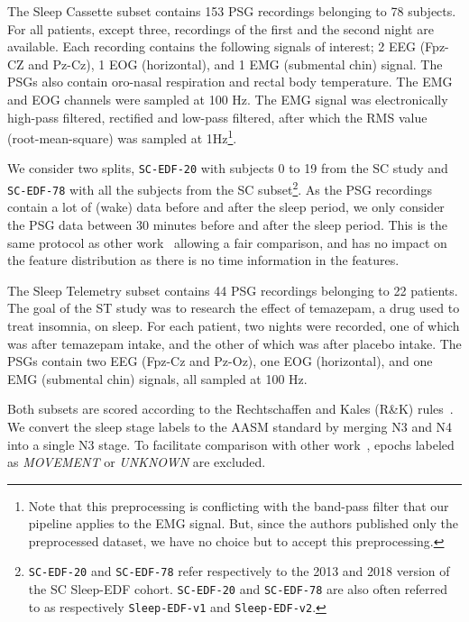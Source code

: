 \documentclass[runningheads]{llncs}
\begin{document}
The Sleep Cassette subset contains 153 PSG recordings belonging to 78 subjects. For all patients, except three, recordings of the first and the second night are available. Each recording contains the following signals of interest; 2 EEG (Fpz-CZ and Pz-Cz), 1 EOG (horizontal), and 1 EMG (submental chin) signal. The PSGs also contain oro-nasal respiration and rectal body temperature. The EMG and EOG channels were sampled at 100 Hz. The EMG signal was electronically high-pass filtered, rectified and low-pass filtered, after which the RMS value (root-mean-square) was sampled at 1Hz\footnote{Note that this preprocessing is conflicting with the band-pass filter that our pipeline applies to the EMG signal. But, since the authors published only the preprocessed dataset, we have no choice but to accept this preprocessing.}.


We consider two splits, \texttt{SC-EDF-20} with subjects 0 to 19 from the SC study and \texttt{SC-EDF-78} with all the subjects from the SC subset\footnote{\texttt{SC-EDF-20} and \texttt{SC-EDF-78} refer respectively to the 2013 and 2018 version of the SC Sleep-EDF cohort. \texttt{SC-EDF-20} and \texttt{SC-EDF-78} are also often referred to as respectively \texttt{Sleep-EDF-v1} and \texttt{Sleep-EDF-v2}.}.
As the PSG recordings contain a lot of (wake) data before and after the sleep period, we only consider the PSG data between 30 minutes before and after the sleep period. This is the same protocol as other work~\cite{supratak2017deepsleepnet,perslev2021usleep,phan2021xsleepnet,phan2022sleeptransformer,supratak2020tinysleepnet,guillot2021robustsleepnet,mousavi2019sleepeegnet,seo2020iitnet} allowing a fair comparison, and has no impact on the feature distribution as there is no time information in the features.

The Sleep Telemetry subset contains 44 PSG recordings belonging to 22 patients. The goal of the ST study was to research the effect of temazepam, a drug used to treat insomnia, on sleep. For each patient, two nights were recorded, one of which was after temazepam intake, and the other of which was after placebo intake. The PSGs contain two EEG (Fpz-Cz and Pz-Oz), one EOG (horizontal), and one EMG (submental chin) signals, all sampled at 100 Hz.

Both subsets are scored according to the Rechtschaffen and Kales (R\&K) rules~\cite{rechtschaffen1968manual}. We convert the sleep stage labels to the AASM standard by merging N3 and N4 into a single N3 stage. To facilitate comparison with other work~\cite{guillot2021robustsleepnet,phan2021xsleepnet,supratak2020tinysleepnet,guillot2020dreem__simplesleepnet,mousavi2019sleepeegnet,phan2020towards,seo2020iitnet,supratak2017deepsleepnet,phan2022sleeptransformer,fiorillo2021deepsleepnetlite}, epochs labeled as \textit{MOVEMENT} or \textit{UNKNOWN} are excluded.
\end{document}
